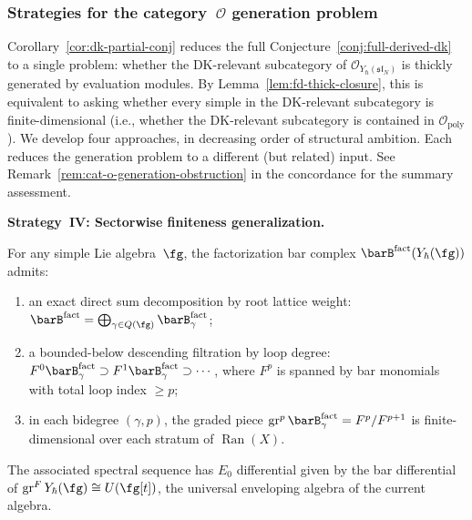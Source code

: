\subsubsection*{Strategies for the category~$\mathcal{O}$
generation problem}
\label{sec:cat-O-strategies}

Corollary~\ref{cor:dk-partial-conj} reduces the full
Conjecture~\ref{conj:full-derived-dk} to a single problem: whether
the DK-relevant subcategory of
$\mathcal{O}_{Y_\hbar(\mathfrak{sl}_N)}$ is thickly generated
by evaluation modules.
By Lemma~\ref{lem:fd-thick-closure}, this is equivalent to asking
whether every simple in the DK-relevant subcategory is
finite-dimensional (i.e., whether the DK-relevant subcategory
is contained in $\mathcal{O}_{\mathrm{poly}}$).
We develop four approaches, in decreasing
order of structural ambition.  Each reduces the generation problem to
a different (but related) input.  See
Remark~\ref{rem:cat-o-generation-obstruction} in the concordance
for the summary assessment.

\medskip

\noindent\textbf{Strategy~IV\@: Sectorwise finiteness
generalization.}

\begin{proposition}
\label{prop:yangian-bar-loop-weight}
For any simple Lie algebra~$\fg$, the factorization bar complex
$\barB^{\mathrm{fact}}(Y_\hbar(\fg))$ admits:
\begin{enumerate}[label=\textup{(\alph*)}]
\item an exact direct sum decomposition by root lattice weight:
  $\barB^{\mathrm{fact}} = \bigoplus_{\gamma \in
  Q(\fg)} \barB^{\mathrm{fact}}_\gamma$;
\item a bounded-below descending filtration by loop degree:
  $F^0 \barB^{\mathrm{fact}}_\gamma \supset
  F^1 \barB^{\mathrm{fact}}_\gamma \supset \cdots$,
  where $F^p$ is spanned by bar monomials with total loop index
  $\ge p$;
\item in each bidegree $(\gamma, p)$, the graded piece
  $\operatorname{gr}^p \barB^{\mathrm{fact}}_\gamma =
  F^p / F^{p+1}$ is finite-dimensional over each stratum of
  $\operatorname{Ran}(X)$.
\end{enumerate}
The associated spectral sequence has $E_0$ differential given by
the bar differential of
$\operatorname{gr}^F Y_\hbar(\fg) \cong
U(\fg[t])$, the universal enveloping algebra of the
current algebra.
\end{proposition}

